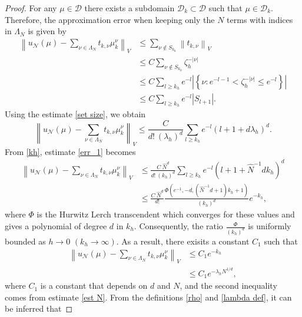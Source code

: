 \documentclass[10pt,a4paper]{amsart}
\begin{document}
\begin{proof}
    For any $\mu \in \mathcal{D}$ there exists a subdomain $\mathcal{D}_k \subset \mathcal{D}$ such that $\mu \in \mathcal{D}_k$. Therefore, the approximation error when keeping only the $N$ terms with indices in $\Lambda_N$ is given by 
    \begin{align}
          \left\|u_{\mathcal{N}}(\mu)-\sum_{\nu \in \Lambda_N} t_{k,\nu} \mu_k^\nu \right\|_V 
        & \leq \sum_{\nu \notin S_{k_h}} \left\|t_{k,\nu} \right\|_V \\
        & \leq C\sum_{\nu \notin S_{k_h}} \zeta_h^{-|\nu|} \\
        & \leq C \sum_{l \geq k_h } e^{-l} \left|\left\{\nu: e^{-l-1} < \zeta_h^{-|\nu|} \leq e^{-l}\right\}\right|\\ %
        & \leq C \sum_{l \geq k_h } e^{-l} \left|S_{l+1}\right|.
    \end{align}
    Using the estimate \eqref{set size}, we obtain
    \begin{equation}
          \left\|u_{\mathcal{N}}(\mu)-\sum_{\nu \in \Lambda_N} t_{k,\nu} \mu_k^\nu \right\|_V  \leq \frac{C}{d! \ (\lambda_h)^d} \sum_{l \geq k_h } e^{-l} \left(l+1+ d\lambda_h\right)^d.
        \label{err_1}
    \end{equation}
    From \eqref{kh}, estimate \eqref{err_1} becomes
    \begin{align}
          \left\|u_{\mathcal{N}}(\mu)-\sum_{\nu \in \Lambda_N} t_{k,\nu} \mu_k^\nu \right\|_V &  \leq \frac{C \ \hat{N}^d}{d! \  (k_h)^d} \sum_{l \geq k_h } e^{-l} \left(l+1+\hat{N}^{-1}d k_h\right)^d\\
        & \leq \frac{C \ \hat{N}^d}{d!} \frac{\Phi\left(e^{-1},-d,(\hat{N}^{-1}d+1)k_h+1\right)}{(k_h)^d} e^{-k_h},
    \end{align}
    where $\Phi$ is the Hurwitz Lerch transcendent which converges for these values and gives a polynomial of degree $d$ in $k_h$. Consequently, the ratio $\frac{\Phi}{(k_h)^d}$ is uniformly bounded as $h\rightarrow 0$ $\left(k_h \rightarrow \infty\right)$. As a result, there exisits a constant $C_1$ such that
    \begin{align}
          \left\|u_{\mathcal{N}}(\mu)-\sum_{\nu \in \Lambda_N} t_{k,\nu} \mu_k^\nu \right\|_V &\leq C_1 e^{-k_h}\\
        &\leq C_1 e^{-\lambda_hN^{1/d}},
    \end{align}
    where $C_1$ is a constant that depends on $d$ and $N$, and the second inequality comes from estimate \eqref{est N}. From the definitions \eqref{rho} and \eqref{lambda def}, it can be inferred that 

\end{proof}
\end{document}

